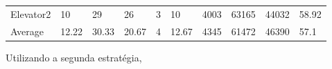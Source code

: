 \documentclass[a4paper]{article}
\begin{document}
\begin{table}[h]
\begin{tabular}{@{}llllllllll@{}}
Elevator2 & 10        & 29            & 26           & 3                                                               & 10                                                                  & 4003                                                         & 63165                                                 & 44032                                                   & 58.92         \\
Average   & 12.22     & 30.33         & 20.67        & 4                                                               & 12.67                                                               & 4345                                                         & 61472                                                 & 46390                                                   & 57.1          \\ \bottomrule
\end{tabular}
\end{table}

\newpage

Utilizando a segunda estratégia,
\end{document}
